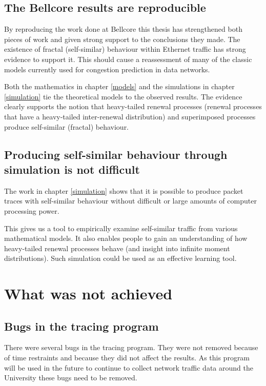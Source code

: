 \subsection{The Bellcore results are reproducible}

By reproducing the work done at Bellcore \cite{Bell:1} this thesis has
strengthened both pieces of work and given strong support to the
conclusions they made.  The existence of fractal (self-similar)
behaviour within Ethernet traffic has strong evidence to support it.
This should cause a reassessment of many of the classic models currently
used for congestion prediction in data networks.

Both the mathematics in chapter \ref{models} and the simulations in
chapter \ref{simulation} tie the theoretical models to the observed
results.  The evidence clearly supports the notion that heavy-tailed
renewal processes (renewal processes that have a heavy-tailed
inter-renewal distribution) and superimposed processes produce
self-similar (fractal) behaviour.

\subsection{Producing self-similar behaviour through simulation is not difficult}

The work in chapter \ref{simulation} shows that it is possible to
produce packet traces with self-similar behaviour without difficult
or large amounts of computer processing power.

This gives us a tool to empirically examine self-similar traffic from
various mathematical models.  It also enables people to gain an
understanding of how heavy-tailed renewal processes behave (and
insight into infinite moment distributions).  Such simulation could be
used as an effective learning tool.

\section{What was not achieved}

\subsection{Bugs in the tracing program}

There were several bugs in the tracing program.  They were not removed
because of time restraints and because they did not affect the
results.  As this program will be used in the future to continue to
collect network traffic data around the University these bugs need to
be removed.

